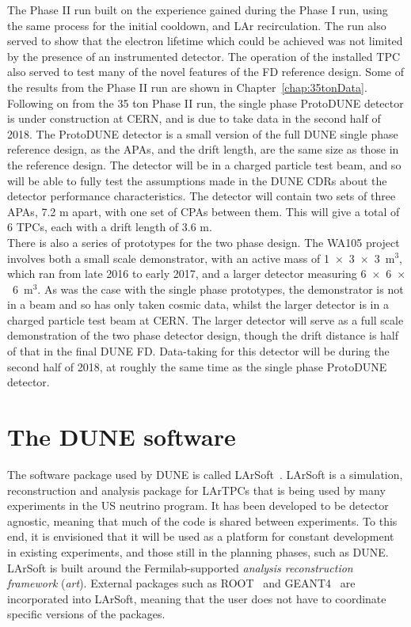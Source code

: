 The Phase II run built on the experience gained during the Phase I run, using the same process for the initial cooldown, and LAr recirculation. The run also served to show that the electron lifetime which could be achieved was not limited by the presence of an instrumented detector. The operation of the installed TPC also served to test many of the novel features of the FD reference design. Some of the results from the Phase II run are shown in Chapter~\ref{chap:35tonData}. \\

Following on from the 35 ton Phase II run, the single phase ProtoDUNE detector is under construction at CERN, and is due to take data in the second half of 2018. The ProtoDUNE detector is a small version of the full DUNE single phase reference design, as the APAs, and the drift length, are the same size as those in the reference design. The detector will be in a charged particle test beam, and so will be able to fully test the assumptions made in the DUNE CDRs about the detector performance characteristics. The detector will contain two sets of three APAs, 7.2 m apart, with one set of CPAs between them. This will give a total of 6 TPCs, each with a drift length of 3.6 m. \\

There is also a series of prototypes for the two phase design. The WA105 project involves both a small scale demonstrator, with an active mass of 1~$\times$~3~$\times$~3~m$^3$, which ran from late 2016 to early 2017, and a larger detector measuring 6~$\times$~6~$\times$~6~m$^3$. As was the case with the single phase prototypes, the demonstrator is not in a beam and so has only taken cosmic data, whilst the larger detector is in a charged particle test beam at CERN. The larger detector will serve as a full scale demonstration of the two phase detector design, though the drift distance is half of that in the final DUNE FD. Data-taking for this detector will be during the second half of 2018, at roughly the same time as the single phase ProtoDUNE detector. \\

\section{The DUNE software} \label{sec:LArSoft} %
The software package used by DUNE is called LArSoft~\citep{Church_LArSoft, LArSoftOrg}. LArSoft is a simulation, reconstruction and analysis package for LArTPCs that is being used by many experiments in the US neutrino program. It has been developed to be detector agnostic, meaning that much of the code is shared between experiments. To this end, it is envisioned that it will be used as a platform for constant development in existing experiments, and those still in the planning phases, such as DUNE. LArSoft is built around the Fermilab-supported \emph{analysis reconstruction framework} (\emph{art}). External packages such as ROOT~\citep{ROOT} and GEANT4~\citep{GEANT4} are incorporated into LArSoft, meaning that the user does not have to coordinate specific versions of the packages. \\

